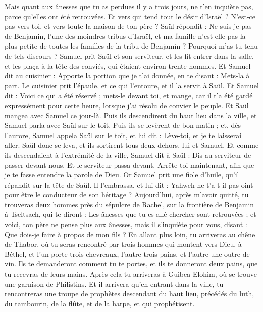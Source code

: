 \begin{multicols}{2}
Mais quant aux ânesses que tu as perdues il y a trois jours, ne t'en inquiète pas, parce qu'elles ont été retrouvées. Et vers qui tend tout le désir d'Israël ? N'est-ce pas vers toi, et vers toute la maison de ton père ?
Saül répondit : Ne suis-je pas de Benjamin, l'une des moindres tribus d'Israël, et ma famille n'est-elle pas la plus petite de toutes les familles de la tribu de Benjamin ? Pourquoi m'as-tu tenu de tels discours ?
Samuel prit Saül et son serviteur, et les fit entrer dans la salle, et les plaça à la tête des conviés, qui étaient environ trente hommes.
Et Samuel dit au cuisinier : Apporte la portion que je t'ai donnée, en te disant : Mets-la à part.
Le cuisinier prit l'épaule, et ce qui l'entoure, et il la servit à Saül. Et Samuel dit : Voici ce qui a été réservé ; mets-le devant toi, et mange, car il t'a été gardé expressément pour cette heure, lorsque j'ai résolu de convier le peuple. Et Saül mangea avec Samuel ce jour-là.
Puis ils descendirent du haut lieu dans la ville, et Samuel parla avec Saül sur le toit.
Puis ils se levèrent de bon matin ; et, dès l'aurore, Samuel appela Saül sur le toit, et lui dit : Lève-toi, et je te laisserai aller. Saül donc se leva, et ils sortirent tous deux dehors, lui et Samuel.
Et comme ils descendaient à l'extrémité de la ville, Samuel dit à Saül : Dis au serviteur de passer devant nous. Et le serviteur passa devant. Arrête-toi maintenant, afin que je te fasse entendre la parole de Dieu.
\VerseOne{}Or Samuel prit une fiole d'huile, qu'il répandit sur la tête de Saül. Il l'embrassa, et lui dit : Yahweh ne t'a-t-il pas oint pour être le conducteur de son héritage ?
Aujourd'hui, après m'avoir quitté, tu trouveras deux hommes près du sépulcre de Rachel, sur la frontière de Benjamin à Tseltsach, qui te diront : Les ânesses que tu es allé chercher sont retrouvées ; et voici, ton père ne pense plus aux ânesses, mais il s'inquiète pour vous, disant : Que dois-je faire à propos de mon fils ?
En allant plus loin, tu arriveras au chêne de Thabor, où tu seras rencontré par trois hommes qui montent vers Dieu, à Béthel, et l'un porte trois chevreaux, l'autre trois pains, et l'autre une outre de vin.
Ils te demanderont comment tu te portes, et ils te donneront deux pains, que tu recevras de leurs mains.
Après cela tu arriveras à Guibea-Elohim, où se trouve une garnison de Philistins. Et il arrivera qu'en entrant dans la ville, tu rencontreras une troupe de prophètes descendant du haut lieu, précédés du luth, du tambourin, de la flûte, et de la harpe, et qui prophétisent.

\end{multicols}
